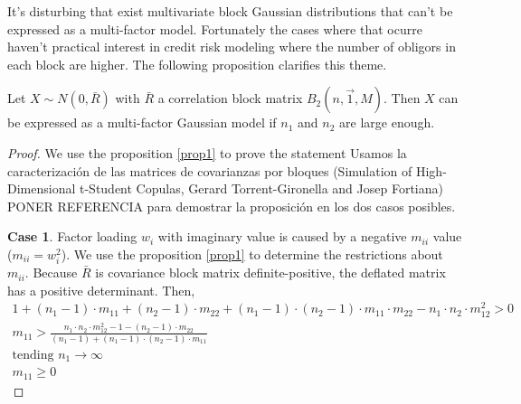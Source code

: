 \documentclass[11pt,fleqn]{book} %
\begin{document}
It's disturbing that exist multivariate block Gaussian distributions 
that can't be expressed as a multi-factor model. Fortunately the 
cases where that ocurre haven't practical interest in credit risk
modeling where the number of obligors in each block are higher. 
The following proposition clarifies this theme.

\begin{proposition}
	\label{prop:gmfamgb}
	Let $X \sim N(0,\bar{R})$ with $\bar{R}$ a correlation block matrix 
	$B_2(n,\vec{1},M)$. Then $X$ can be expressed as a multi-factor 
	Gaussian model if $n_1$ and $n_2$ are large enough.
\end{proposition}
\begin{proof}
	We use the proposition \ref{prop1} to prove the statement Usamos la caracterización de las matrices de covarianzas por bloques (Simulation of High-Dimensional t-Student Copulas, Gerard Torrent-Gironella and Josep Fortiana) PONER REFERENCIA para demostrar la proposición en los dos casos posibles.
	
	\textbf{Case 1}. Factor loading $w_i$ with imaginary value is caused by a negative 
	$m_{ii}$ value ($m_{ii} = w_i^2$). We use the proposition \ref{prop1} to determine
	the restrictions about $m_{ii}$. Because $\bar{R}$ is covariance block matrix 
	definite-positive, the deflated matrix has a positive determinant. Then,
	\begin{displaymath}
		\begin{array}{l}
			1 + (n_1-1) \cdot m_{11} + (n_2-1) \cdot m_{22} +                     
			(n_1-1) \cdot (n_2-1) \cdot m_{11} \cdot m_{22} -                     
			n_1 \cdot n_2 \cdot m_{12}^2 > 0                                      
			                                                                      \\
			m_{11} > \frac{n_1 \cdot n_2 \cdot m_{12}^2 -1 -(n_2-1) \cdot m_{22}} 
			{(n_1-1) + (n_1-1) \cdot (n_2-1) \cdot m_{11}}                        
			                                                                      \\
			\text{tending } n_1 \to \infty                                        
			                                                                      \\
			m_{11} \ge 0                                                          
		\end{array}
	\end{displaymath}
	

\end{proof}
\end{document}
